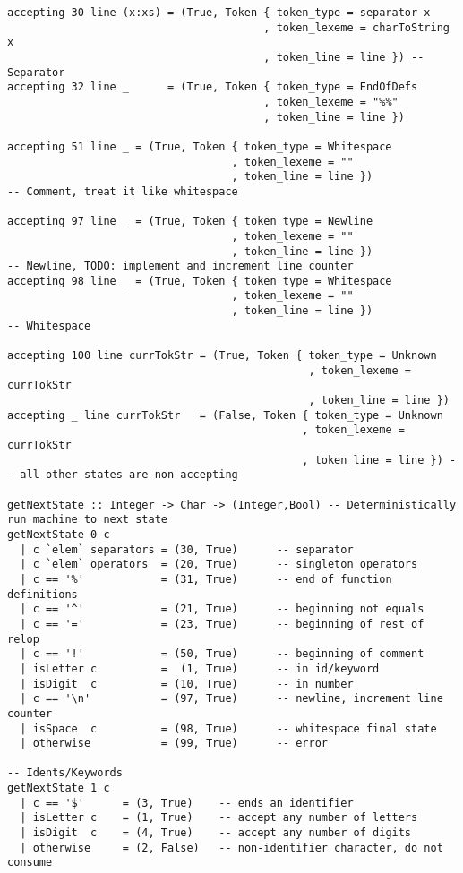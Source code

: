\documentclass[11pt]{article}
\begin{document}
\begin{verbatim}
accepting 30 line (x:xs) = (True, Token { token_type = separator x
                                        , token_lexeme = charToString x
                                        , token_line = line }) -- Separator
accepting 32 line _      = (True, Token { token_type = EndOfDefs
                                        , token_lexeme = "%%"
                                        , token_line = line })

accepting 51 line _ = (True, Token { token_type = Whitespace
                                   , token_lexeme = ""
                                   , token_line = line })                        -- Comment, treat it like whitespace

accepting 97 line _ = (True, Token { token_type = Newline
                                   , token_lexeme = ""
                                   , token_line = line })                           -- Newline, TODO: implement and increment line counter
accepting 98 line _ = (True, Token { token_type = Whitespace
                                   , token_lexeme = ""
                                   , token_line = line })                        -- Whitespace

accepting 100 line currTokStr = (True, Token { token_type = Unknown
                                               , token_lexeme = currTokStr
                                               , token_line = line })
accepting _ line currTokStr   = (False, Token { token_type = Unknown
                                              , token_lexeme = currTokStr
                                              , token_line = line }) -- all other states are non-accepting

getNextState :: Integer -> Char -> (Integer,Bool) -- Deterministically run machine to next state
getNextState 0 c
  | c `elem` separators = (30, True)      -- separator
  | c `elem` operators  = (20, True)      -- singleton operators
  | c == '%'            = (31, True)      -- end of function definitions
  | c == '^'            = (21, True)      -- beginning not equals
  | c == '='            = (23, True)      -- beginning of rest of relop
  | c == '!'            = (50, True)      -- beginning of comment
  | isLetter c          =  (1, True)      -- in id/keyword
  | isDigit  c          = (10, True)      -- in number
  | c == '\n'           = (97, True)      -- newline, increment line counter
  | isSpace  c          = (98, True)      -- whitespace final state
  | otherwise           = (99, True)      -- error

-- Idents/Keywords
getNextState 1 c
  | c == '$'      = (3, True)    -- ends an identifier
  | isLetter c    = (1, True)    -- accept any number of letters
  | isDigit  c    = (4, True)    -- accept any number of digits
  | otherwise     = (2, False)   -- non-identifier character, do not consume


\end{verbatim}
\end{document}
